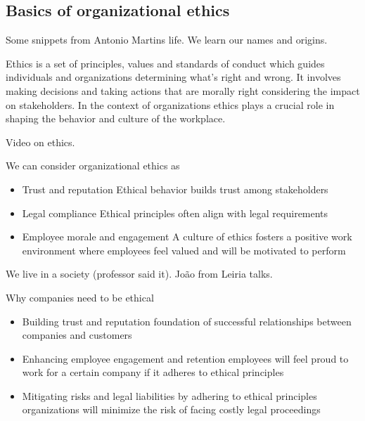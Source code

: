 \subsection{Basics of organizational ethics}

Some snippets from Antonio Martins life. We learn our names and origins. 

\vspace{10pt}

Ethics is a set of principles, values and standards of conduct which guides individuals and organizations determining what's right and wrong. It involves making decisions and taking actions that are morally right considering the impact on stakeholders. In the context of organizations ethics plays a crucial role in shaping the behavior and culture of the workplace.

Video on ethics.

\vspace{10pt}

We can consider organizational ethics as 
\begin{itemize}
    \item Trust and reputation \ra Ethical behavior builds trust among stakeholders
    \item Legal compliance \ra Ethical principles often align with legal requirements
    \item Employee morale and engagement \ra A culture of ethics fosters a positive work environment where employees feel valued and will be motivated to perform
\end{itemize}

We live in a society (professor said it). João from Leiria talks. 

\vspace{10pt}

Why companies need to be ethical

\begin{itemize}
    \item Building trust and reputation \ra foundation of successful relationships between companies and customers
    \item Enhancing employee engagement and retention \ra employees will feel proud to work for a certain company if it adheres to ethical principles
    \item Mitigating risks and legal liabilities \ra by adhering to ethical principles organizations will minimize the risk of facing costly legal proceedings
\end{itemize}

